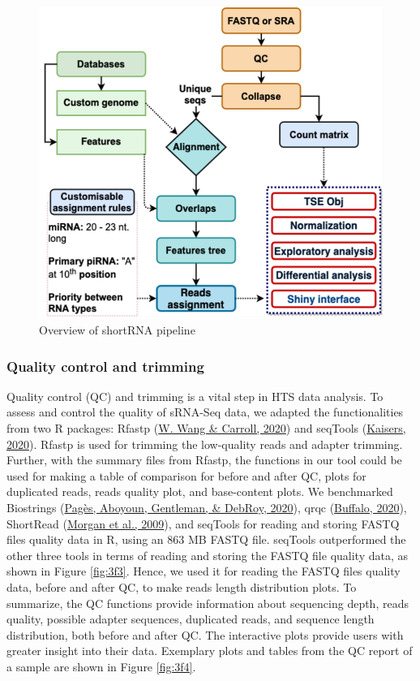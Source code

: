 \documentclass[12pt,twoside]{reedthesis}
\begin{document}
\begin{figure}[H]

{\centering \includegraphics{thesis_files/figure-latex/3f2-1} 

}

\caption{Overview of shortRNA pipeline}\label{fig:3f2}
\end{figure}
\hypertarget{quality-control-and-trimming}{%
\subsubsection{Quality control and trimming}\label{quality-control-and-trimming}}

Quality control (QC) and trimming is a vital step in HTS data analysis.
To assess and control the quality of sRNA-Seq data, we adapted the
functionalities from two R packages: Rfastp (\protect\hyperlink{ref-wang2020}{W. Wang \& Carroll, 2020}) and seqTools
(\protect\hyperlink{ref-kaisers2020}{Kaisers, 2020}). Rfastp is used for trimming the low-quality reads and
adapter trimming. Further, with the summary files from Rfastp, the
functions in our tool could be used for making a table of comparison for
before and after QC, plots for duplicated reads, reads quality plot, and
base-content plots. We benchmarked Biostrings (\protect\hyperlink{ref-paguxe8s2020}{Pagès, Aboyoun, Gentleman, \& DebRoy, 2020}), qrqc
(\protect\hyperlink{ref-buffalo2020}{Buffalo, 2020}), ShortRead (\protect\hyperlink{ref-morgan2009}{Morgan et al., 2009}), and seqTools for reading and
storing FASTQ files quality data in R, using an 863 MB FASTQ file.
seqTools outperformed the other three tools in terms of reading and
storing the FASTQ file quality data, as shown in Figure \ref{fig:3f3}. Hence, we
used it for reading the FASTQ files quality data, before and after QC,
to make reads length distribution plots. To summarize, the QC functions
provide information about sequencing depth, reads quality, possible
adapter sequences, duplicated reads, and sequence length distribution,
both before and after QC. The interactive plots provide users with
greater insight into their data. Exemplary plots and tables from the QC
report of a sample are shown in Figure \ref{fig:3f4}.
\end{document}
